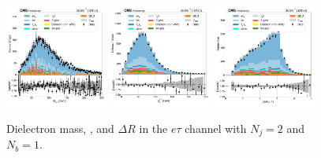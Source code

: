 \begin{figure}[htb!]
    \centering
    \includegraphics[width=0.3\textwidth]{chapters/Appendix/sectionPlots/figures/data_mc_overlays/etau_2016_cat_eq2_eq1_signal_linear_lepton_dilepton1_mass}
    \includegraphics[width=0.3\textwidth]{chapters/Appendix/sectionPlots/figures/data_mc_overlays/etau_2016_cat_eq2_eq1_signal_linear_lepton_dilepton1_pt}
    \includegraphics[width=0.3\textwidth]{chapters/Appendix/sectionPlots/figures/data_mc_overlays/etau_2016_cat_eq2_eq1_signal_linear_lepton_dilepton1_delta_r}
    \caption{Dielectron mass, \pt, and $\Delta R$ in the $e\tau$ channel
    with $N_{j} = 2$ and $N_{b} = 1$.}
    \label{fig:etau_5_dilepton}
\end{figure}

